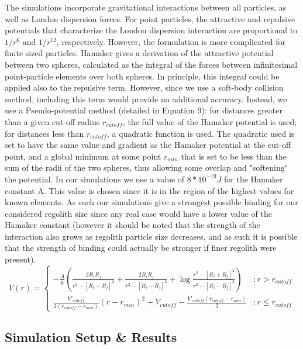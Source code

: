 \documentclass[letterpaper, preprint, paper,11pt]{AAS}	%
\begin{document}
The simulations incorporate gravitational interactions between all particles, as well as London dispersion forces. For point particles, the attractive and repulsive potentials that characterize the London dispersion interaction are proportional to ${1}/{r^6}$ and ${1}/{r^{12}}$, respectively. However, the formulation is more complicated for finite sized particles. Hamaker\cite{hamaker} gives a derivation of the attractive potential between two spheres, calculated as the integral of the forces between infinitesimal point-particle elements over both spheres. In principle, this integral could be applied also to the repulsive term. However, since we use a soft-body collision method, including this term would provide no additional accuracy. Instead, we use a Pseudo-potential method (detailed in Equation 9): for distances greater than a given cut-off radius $r_{cutoff}$, the full value of the Hamaker\cite{hamaker} potential is used; for distances less than $r_{cutoff}$, a quadratic function is used. The quadratic used is set to have the same value and gradient as the Hamaker\cite{hamaker} potential at the cut-off point, and a global minimum at some point $r_{min}$ that is set to be less than the sum of the radii of the two spheres, thus allowing some overlap and "softening" the potential. In our simulations we use a value of $8*10^{-19} J$ for the Hamaker constant A. This value is chosen since it is in the region of the highest values for known elements. As such our simulations give a strongest possible binding for our considered regolith size since any real case would have a lower value of the Hamaker constant (however it should be noted that the strength of the interaction also grows as regolith particle size decreases, and as such it is possible that the strength of binding could actually be stronger if finer regolith were present).
\begin{equation}
V(r) = \left\{
\begin{array}{lr}
-\frac{A}{6}\left(\frac{2R_iR_j}{r^2-[R_i+R_j]^2}+\frac{2R_iR_j}{r^2-[R_i-R_j]^2}+\log\frac{r^2-[R_i+R_j]^2}{r^2-[R_i-R_j]^2}\right) & : r > r_{cutoff}\\
\frac{V'_{cutoff}}{2(r_{cutoff}-r_{min})}(r-r_{min})^2+V_{cutoff} - \frac{V'_{cutoff}(r_{cutoff}-r_{min})}{2} & : r \leq r_{cutoff}
\end{array}
\right.
\end{equation}

\subsection{Simulation Setup \& Results}
\end{document}
